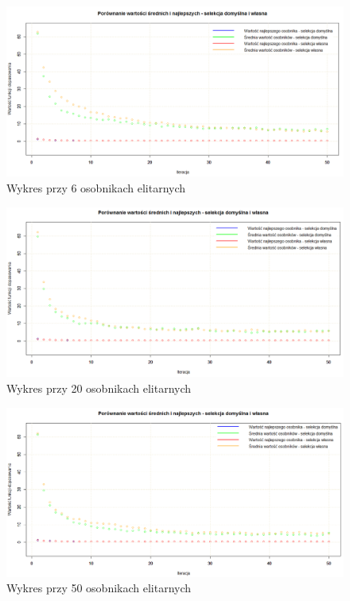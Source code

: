 \begin{figure}[H]
	\centering
	\hspace*{-0.8in}
	\includegraphics[scale = 0.47]{img/zad1/sel_6}
	\caption{Wykres przy 6 osobnikach elitarnych}  
	\label{rys:sel_6} 
\end{figure}

\begin{figure}[H]
	\centering
	\hspace*{-0.8in}
	\includegraphics[scale = 0.5]{img/zad1/sel_20}
	\caption{Wykres przy 20 osobnikach elitarnych}  
	\label{rys:sel_20} 
\end{figure}

\begin{figure}[H]
	\centering
	\hspace*{-0.8in}
	\includegraphics[scale = 0.5]{img/zad1/sel_50}
	\caption{Wykres przy 50 osobnikach elitarnych}  
	\label{rys:sel_50} 
\end{figure}

